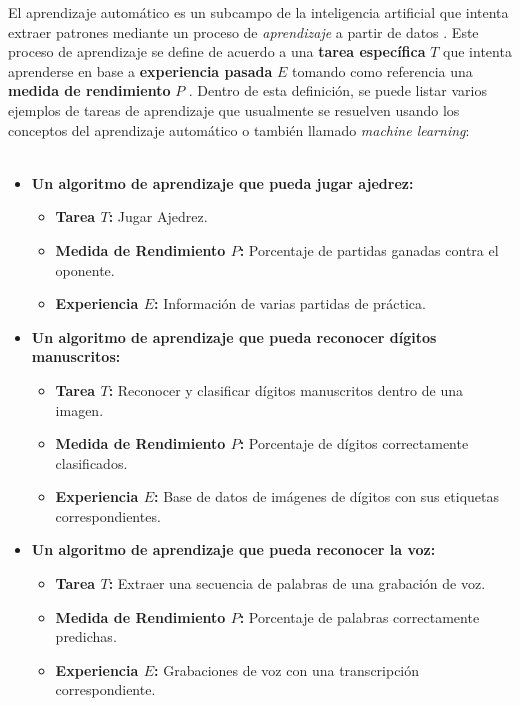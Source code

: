     El aprendizaje automático es un subcampo de la inteligencia artificial que intenta extraer 
    patrones mediante un proceso de \textit{aprendizaje} a partir de datos \cite{Mitchell1990}. Este proceso 
    de aprendizaje se define de acuerdo a una \textbf{tarea específica} $T$ que intenta aprenderse en base 
    a \textbf{experiencia pasada} $E$ tomando como referencia una \textbf{medida de rendimiento} $P$ . 
    Dentro de esta definición, se puede listar varios ejemplos de tareas de aprendizaje que usualmente se resuelven  
    usando los conceptos del aprendizaje automático o también llamado \textit{machine learning}:
    \\
    \\
    \begin{itemize}
        \item \textbf{Un algoritmo de aprendizaje que pueda jugar ajedrez:}
        \begin{itemize}
            \item \textbf{Tarea $T$:} Jugar Ajedrez.
            \item \textbf{Medida de Rendimiento $P$:} Porcentaje de partidas ganadas contra el oponente.
            \item \textbf{Experiencia $E$:} Información de varias partidas de práctica.
        \end{itemize}
        
        \item \textbf{Un algoritmo de aprendizaje que pueda reconocer dígitos manuscritos:}
        \begin{itemize}
            \item \textbf{Tarea $T$:} Reconocer y clasificar dígitos manuscritos dentro de una imagen.
            \item \textbf{Medida de Rendimiento $P$:} Porcentaje de dígitos correctamente clasificados.
            \item \textbf{Experiencia $E$:} Base de datos de imágenes de dígitos con sus etiquetas correspondientes.
        \end{itemize}

        \item \textbf{Un algoritmo de aprendizaje que pueda reconocer la voz:}
        \begin{itemize}
            \item \textbf{Tarea $T$:} Extraer una secuencia de palabras de una grabación de voz.
            \item \textbf{Medida de Rendimiento $P$:} Porcentaje de palabras correctamente predichas.
            \item \textbf{Experiencia $E$:} Grabaciones de voz con una transcripción correspondiente.
        \end{itemize}
    
    \end{itemize}
    

